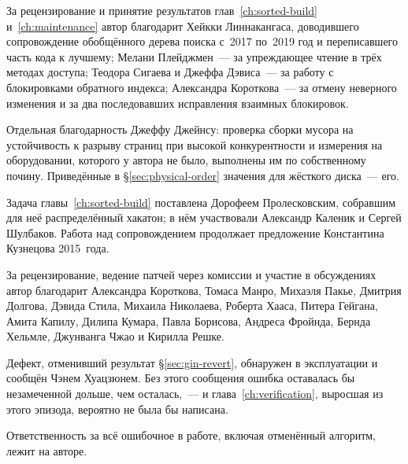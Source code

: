 За рецензирование и принятие результатов глав~\ref{ch:sorted-build}
и~\ref{ch:maintenance} автор благодарит Хейкки Линнакангаса, доводившего
сопровождение обобщённого дерева поиска с~2017 по~2019 год и переписавшего
часть кода к лучшему; Мелани Плейджмен~--- за упреждающее чтение в трёх методах
доступа; Теодора Сигаева и Джеффа Дэвиса~--- за работу с блокировками обратного
индекса; Александра Короткова~--- за отмену неверного изменения и за два
последовавших исправления взаимных блокировок.

Отдельная благодарность Джеффу Джейнсу: проверка сборки мусора на устойчивость
к разрыву страниц при высокой конкурентности и измерения на оборудовании,
которого у автора не было, выполнены им по собственному почину. Приведённые в
§\ref{sec:physical-order} значения для жёсткого диска~--- его.

Задача главы~\ref{ch:sorted-build} поставлена Дорофеем Пролесковским, собравшим
для неё распределённый хакатон; в нём участвовали Александр Каленик и Сергей
Шулбаков. Работа над сопровождением продолжает предложение Константина
Кузнецова 2015~года.

За рецензирование, ведение патчей через комиссии и участие в обсуждениях автор
благодарит Александра Короткова, Томаса Манро, Михаэля Пакье, Дмитрия Долгова,
Дэвида Стила, Михаила Николаева, Роберта Хааса, Питера Гейгана, Амита Капилу,
Дилипа Кумара, Павла Борисова, Андреса Фройнда, Бернда Хельмле, Джунванга Чжао
и Кирилла Решке.

Дефект, отменивший результат §\ref{sec:gin-revert}, обнаружен в эксплуатации и
сообщён Чэнем Хуацзюнем. Без этого сообщения ошибка оставалась бы незамеченной
дольше, чем осталась,~--- и глава~\ref{ch:verification}, выросшая из этого
эпизода, вероятно не была бы написана.

Ответственность за всё ошибочное в работе, включая отменённый алгоритм, лежит
на авторе.
